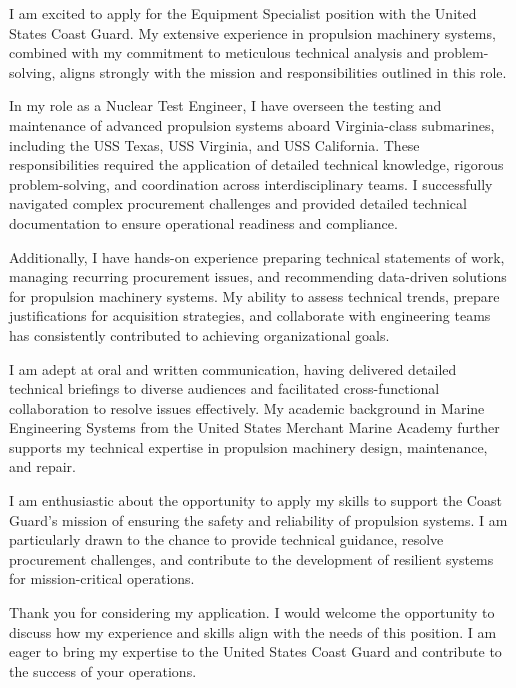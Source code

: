 I am excited to apply for the Equipment Specialist position with the United States Coast Guard.
My extensive experience in propulsion machinery systems, combined with my commitment to meticulous technical analysis and problem-solving, aligns strongly with the mission and responsibilities outlined in this role.

In my role as a Nuclear Test Engineer, I have overseen the testing and maintenance of advanced propulsion systems aboard Virginia-class submarines, including the USS Texas, USS Virginia, and USS California.
These responsibilities required the application of detailed technical knowledge, rigorous problem-solving, and coordination across interdisciplinary teams.
I successfully navigated complex procurement challenges and provided detailed technical documentation to ensure operational readiness and compliance.

Additionally, I have hands-on experience preparing technical statements of work, managing recurring procurement issues, and recommending data-driven solutions for propulsion machinery systems.
My ability to assess technical trends, prepare justifications for acquisition strategies, and collaborate with engineering teams has consistently contributed to achieving organizational goals.

I am adept at oral and written communication, having delivered detailed technical briefings to diverse audiences and facilitated cross-functional collaboration to resolve issues effectively.
My academic background in Marine Engineering Systems from the United States Merchant Marine Academy further supports my technical expertise in propulsion machinery design, maintenance, and repair.

I am enthusiastic about the opportunity to apply my skills to support the Coast Guard’s mission of ensuring the safety and reliability of propulsion systems.
I am particularly drawn to the chance to provide technical guidance, resolve procurement challenges, and contribute to the development of resilient systems for mission-critical operations.

Thank you for considering my application.
I would welcome the opportunity to discuss how my experience and skills align with the needs of this position.
I am eager to bring my expertise to the United States Coast Guard and contribute to the success of your operations.

